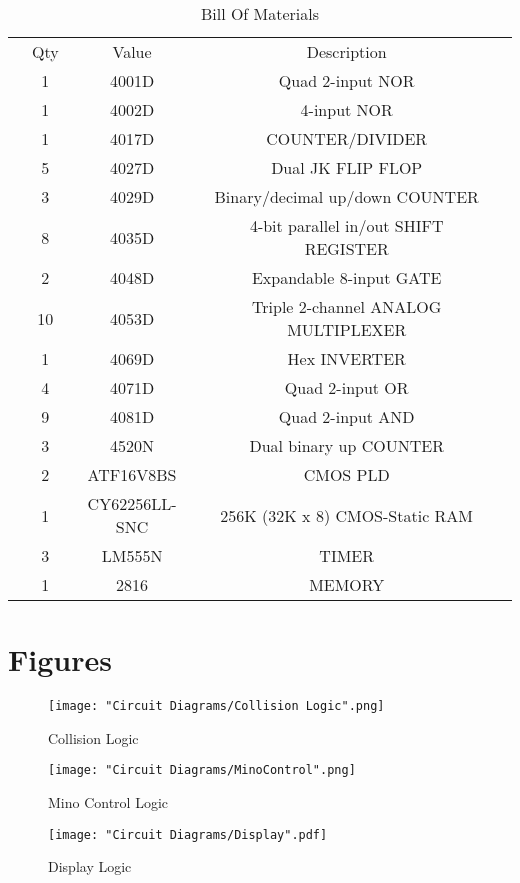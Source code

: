 \documentclass[letterpaper,titlepage,oneside]{article}
\begin{document}
\begin{table}[h!]
\begin{center}
\begin{tabular}{c|c|c|c|c}
\cline{2-4}
&	Qty	&	Value	&	Description	&	\\
\cline{2-4}
& 1 & 4001D & Quad 2-input NOR  & \\
& 1 & 4002D & 4-input NOR & \\
& 1 & 4017D & COUNTER/DIVIDER & \\
& 5 & 4027D & Dual JK FLIP FLOP & \\
& 3 & 4029D & Binary/decimal up/down COUNTER  & \\
& 8 & 4035D & 4-bit parallel in/out SHIFT REGISTER  & \\
& 2 & 4048D & Expandable 8-input GATE & \\
& 10  & 4053D & Triple 2-channel ANALOG MULTIPLEXER & \\
& 1 & 4069D & Hex INVERTER  & \\
& 4 & 4071D & Quad 2-input OR & \\
& 9 & 4081D & Quad 2-input AND  & \\
& 3 & 4520N & Dual binary up COUNTER  & \\
& 2 & ATF16V8BS & CMOS PLD  & \\
& 1 & CY62256LL-SNC & 256K (32K x 8) CMOS-Static RAM  & \\
& 3 & LM555N  & TIMER & \\
& 1 & 2816  & MEMORY  & \\
\cline{2-4}

\end{tabular}
\end{center}
\caption{Bill Of Materials}\label{BOM}
\end{table}



\clearpage
\section{Figures}
\begin{figure}[h!]
\begin{center}
\texttt{[image: "Circuit Diagrams/Collision Logic".png]}
\caption{Collision Logic}
\label{fig:Collision}
\end{center}
\end{figure}

\begin{figure}[h!]
\begin{center}
\texttt{[image: "Circuit Diagrams/MinoControl".png]}
\caption{Mino Control Logic}
\label{fig:Mino Control}
\end{center}
\end{figure}

\begin{figure}[h!]
\begin{center}
\texttt{[image: "Circuit Diagrams/Display".pdf]}
\caption{Display Logic}
\label{fig:Display}
\end{center}
\end{figure}

\clearpage
\end{document}
